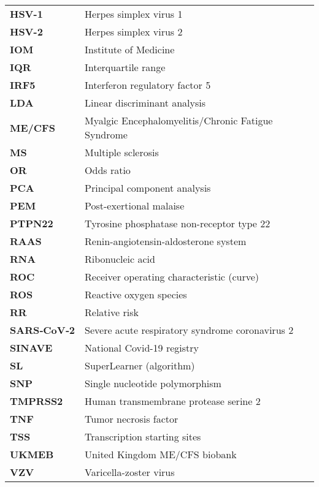 \begin{longtable}[l]{>{\bfseries}l|l}
    HSV-1        & Herpes simplex virus 1                               \\
    HSV-2        & Herpes simplex virus 2                               \\
    IOM          & Institute of Medicine                                \\
    IQR          & Interquartile range                                  \\
    IRF5         & Interferon regulatory factor 5                       \\
    LDA          & Linear discriminant analysis                         \\
    ME/CFS       & Myalgic Encephalomyelitis/Chronic Fatigue Syndrome   \\
    MS           & Multiple sclerosis                                   \\
    OR           & Odds ratio                                           \\
    PCA          & Principal component analysis                         \\
    PEM          & Post-exertional malaise                              \\
    PTPN22       & Tyrosine phosphatase non-receptor type 22            \\
    RAAS         & Renin-angiotensin-aldosterone system                 \\
    RNA          & Ribonucleic acid                                     \\
    ROC          & Receiver operating characteristic (curve)            \\
    ROS          & Reactive oxygen species                              \\
    RR           & Relative risk                                        \\
    SARS‑CoV‑2   & Severe acute respiratory syndrome coronavirus 2      \\
    SINAVE       & National Covid-19 registry                           \\
    SL           & SuperLearner (algorithm)                             \\
    SNP          & Single nucleotide polymorphism                       \\
    TMPRSS2      & Human transmembrane protease serine 2                \\
    TNF          & Tumor necrosis factor                                \\
    TSS          & Transcription starting sites                         \\
    UKMEB        & United Kingdom ME/CFS biobank                        \\
    VZV          & Varicella-zoster virus                              
\end{longtable}

\vfill
